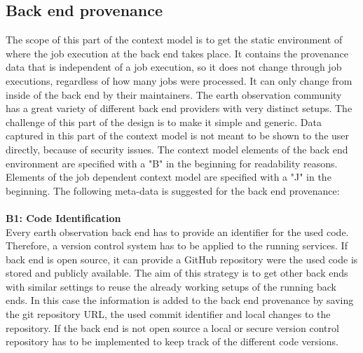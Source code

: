 \documentclass[draft,final]{vutinfth} %
\begin{document}
\subsection{Back end provenance}\label{Design:Back end provenance}
The scope of this part of the context model is to get the static environment of where the job execution at the back end takes place. It contains the provenance data that is independent of a job execution, so it does not change through job executions, regardless of how many jobs were processed. It can only change from inside of the back end by their maintainers. The earth observation community has a great variety of different back end providers with very distinct setups. The challenge of this part of the design is to make it simple and generic. Data captured in this part of the context model is not meant to be shown to the user directly, because of security issues.  The context model elements of the back end environment are specified with a "B" in the beginning for readability reasons. Elements of the job dependent context model are specified with a "J" in the beginning. The following meta-data is suggested for the back end provenance:
\\ \\
\textbf{B1: Code Identification} \\
Every earth observation back end has to provide an identifier for the used code. Therefore, a version control system has to be applied to the running services. If back end is open source, it can provide a GitHub repository were the used code is stored and publicly available. The aim of this strategy is to get other back ends with similar settings to reuse the already working setups of the running back ends. In this case the information is added to the back end provenance by saving the git repository URL, the used commit identifier and local changes to the repository. If the back end is not open source a local or secure version control repository has to be implemented to keep track of the different code versions. 
\end{document}
